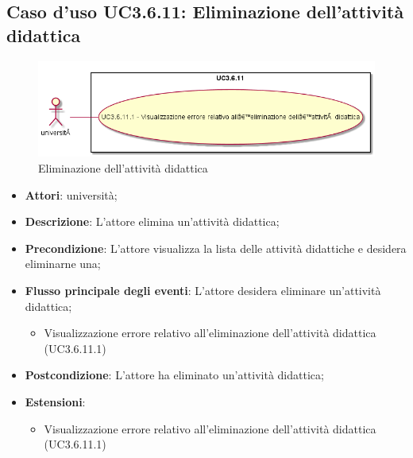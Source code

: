 \subsection{Caso d'uso \texorpdfstring{UC3.6.11}{UC3.6.11}: Eliminazione dell’attività didattica}
\begin{figure} [H]
\centering
\includegraphics[scale=0.45]{./img/UC3-6-11.png}
\caption{Eliminazione dell’attività didattica}\label{}
\end{figure}
\begin{itemize}
\item \textbf{Attori}: università;
\item \textbf{Descrizione}: L'attore elimina un'attività didattica;

\item \textbf{Precondizione}: L'attore visualizza la lista delle attività didattiche e desidera eliminarne una;

\item \textbf{Flusso principale degli eventi}: L'attore desidera eliminare un'attività didattica;

\begin{itemize}
\item Visualizzazione errore relativo all’eliminazione dell’attività didattica (UC3.6.11.1)
\end{itemize}
\item \textbf{Postcondizione}: L'attore ha eliminato un'attività didattica;

\item \textbf{Estensioni}:
\begin{itemize}
\item Visualizzazione errore relativo all’eliminazione dell’attività didattica (UC3.6.11.1)
\end{itemize}
\end{itemize}
